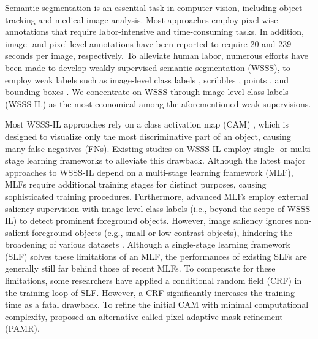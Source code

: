\documentclass[11pt]{article}
\begin{document}
Semantic segmentation is an essential task in computer vision, including object tracking and medical image analysis. {Most approaches \cite{chen2017deeplab, chen2018encoder, liu2019auto} employ pixel-wise annotations that require labor-intensive and time-consuming tasks. In addition, image- and pixel-level annotations have been reported \cite{bearman2016s} to require 20 and 239 seconds per image,  respectively.} To alleviate human labor, numerous efforts have been made to develop weakly supervised semantic segmentation (WSSS), to employ weak labels such as image-level class labels \cite{ahn2018learning, lee2019ficklenet, lee2021anti}, scribbles \cite{lin2016scribblesup}, points \cite{bearman2016s}, and bounding boxes \cite{khoreva2017simple, dai2015boxsup}. We concentrate on WSSS through image-level class labels (WSSS-IL) as the most economical among the aforementioned weak supervisions.


Most WSSS-IL approaches rely on a class activation map (CAM) \cite{zhou2016learning}, which is designed to visualize only the most discriminative part of an object, causing many false negatives (FNs). 
{Existing studies on WSSS-IL employ single- or multi-stage learning frameworks to alleviate this drawback. Although the latest major approaches \citep{zhou2022regional, chen2022self, jiang2022l2g} to WSSS-IL depend on a multi-stage learning framework (MLF), MLFs require additional training stages for distinct purposes, causing sophisticated training procedures. Furthermore, advanced MLFs employ external saliency supervision with image-level class labels (i.e., beyond the scope of WSSS-IL) to detect prominent foreground objects. However, image saliency ignores non-salient foreground objects (e.g., small or low-contrast objects), hindering the broadening of various datasets \cite{everingham2010pascal, lin2014microsoft}.  Although {a single-stage learning framework (SLF)} solves these limitations of an MLF, the performances of existing SLFs \cite{papandreou2015weakly, roy2017combining, zhang2020reliability, araslanov2020single} are generally still far behind those of recent MLFs. To compensate for these limitations, some researchers \cite{kolesnikov2016seed, huang2018weakly, zhang2020reliability} have applied a conditional random field (CRF) in the training loop of SLF. However, a CRF significantly increases the training time as a fatal drawback. To refine the initial CAM with minimal computational complexity, \citet{araslanov2020single} proposed an alternative called pixel-adaptive mask refinement (PAMR).} 
\end{document}
